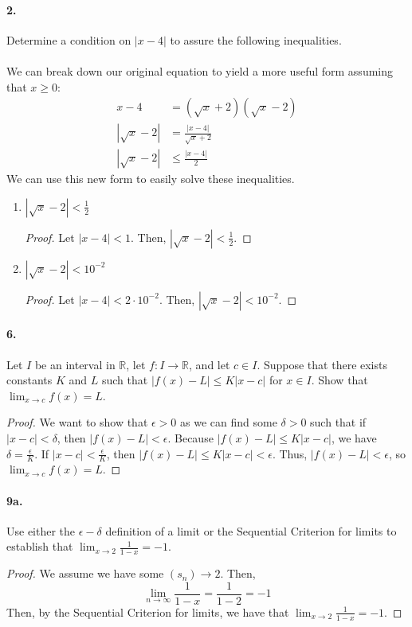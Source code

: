 \documentclass[12pt]{article}
\newcommand\R{\mathbb{R}}
\theoremstyle{remark}
\begin{document}
\paragraph{2.} Determine a condition on $|x - 4|$ to assure the following inequalities. \\\null\\
We can break down our original equation to yield a more useful form assuming that $x \geq 0$:
\begin{align*}
    x - 4 &= (\sqrt{x} + 2)(\sqrt{x} - 2) \\
    |\sqrt{x} - 2| &= \frac{|x - 4|}{\sqrt{x} + 2} \\
    |\sqrt{x} - 2| &\leq \frac{|x - 4|}{2}
\end{align*}
We can use this new form to easily solve these inequalities.
\begin{enumerate}[label=(\alph*)]
    \item $|\sqrt{x} - 2| < \frac{1}{2}$
    \begin{proof}
        Let $|x - 4| < 1$. Then, $|\sqrt{x} - 2| < \frac{1}{2}$.
    \end{proof}
    \item $|\sqrt{x} - 2| < 10^{-2}$
    \begin{proof}
        Let $|x - 4| < 2 \cdot 10^{-2}$. Then, $|\sqrt{x} - 2| < 10^{-2}$.
    \end{proof}
    
\end{enumerate}

\paragraph{6.} Let $I$ be an interval in $\R$, let $f: I \to \R$, and let $c \in I$. Suppose that there exists constants $K$ and $L$ such that $|f(x) - L| \leq K|x - c|$ for $x \in I$. Show that $\lim_{x \to c} f(x) = L$.
\begin{proof}
    We want to show that $\epsilon > 0$ as we can find some $\delta > 0$ such that if $|x - c| < \delta$, then $|f(x) - L| < \epsilon$. Because $|f(x) - L| \leq K|x - c|$, we have $\delta = \frac{\epsilon}{K}$. If $|x - c| < \frac{\epsilon}{K}$, then $|f(x) - L| \leq K|x - c| < \epsilon$. Thus, $|f(x) - L| < \epsilon$, so $\lim_{x \to c} f(x) = L$.
\end{proof}

\paragraph{9a.} Use either the $\epsilon-\delta$ definition of a limit or the Sequential Criterion for limits to establish that $\lim_{x \to 2} \frac{1}{1 - x} = -1$.
\begin{proof}
    We assume we have some $(s_n) \to 2$. Then, $$\lim_{n \to \infty} \frac{1}{1 - x} = \frac{1}{1 - 2} = -1$$ Then, by the Sequential Criterion for limits, we have that $\lim_{x \to 2} \frac{1}{1 - x} = -1$.
\end{proof}
\end{document}
